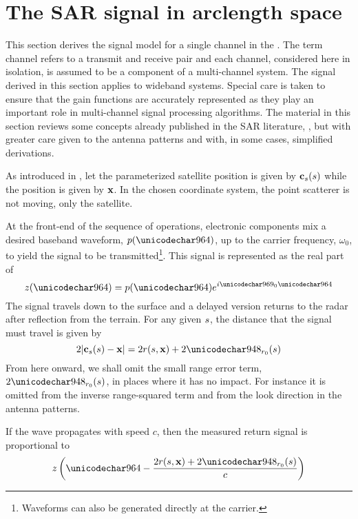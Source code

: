 \section{The SAR signal in arclength space}
\label{sc:sararc}
This section derives the signal model for a single channel in the . The term channel refers to a transmit and receive pair and each channel, considered here in isolation, is assumed to be a component of a multi-channel system. The signal derived in this section applies to \gls{wideband} systems. Special care is taken to ensure that the  gain functions are accurately represented as they play an important role in multi-channel signal processing algorithms. The material in this section reviews some concepts already published in the SAR literature, \cite{Cumming2003, Cumming2005, Franc99, Raney1992, Bamler1992}, but with greater care given to the antenna patterns and with, in some cases, simplified derivations.
\par
As introduced in \cite{EnderSignalTheoretic}, let the parameterized satellite position is given by $\mathbf{c}_s(s)$ while the  position is given by $\mathbf{\mathbf{x}}$. In the chosen coordinate system, the point scatterer is not moving, only the satellite.
\par
At the front-end of the sequence of operations, electronic components mix a desired baseband waveform, $\envelope(\fasttime)$, up to the carrier frequency, $\omega_0$, to yield the signal to be transmitted\footnote{Waveforms can also be generated directly at the carrier.}. This signal is represented as the real part of
\begin{equation}
 \pulse(\fasttime)=\envelope(\fasttime)\eex{\im\omega_0\fasttime}
\end{equation}
The signal travels down to the surface and a delayed version returns to the radar after reflection from the terrain. For any given $s$, the distance that the signal must travel is given by
\begin{equation}
 2\magVec{\sats(\parm)-\vct\target} = 2\amplitude\range(\parm, \targetnoparm)+2\rangeErrorZero(\parm)
\end{equation}
From here onward, we shall omit the small range error term, $2\rangeErrorZero(\parm)$, in places where it has no impact. For instance it is omitted from the inverse range-squared term and from the look direction in the antenna patterns.
\par
If the wave propagates with speed $c$, then the measured return signal is proportional to
\begin{equation}
 \pulse\left(\fasttime-\frac{2\amplitude\range(\parm, \targetnoparm)+2\rangeErrorZero(\parm)}{c}\right)
\end{equation}
